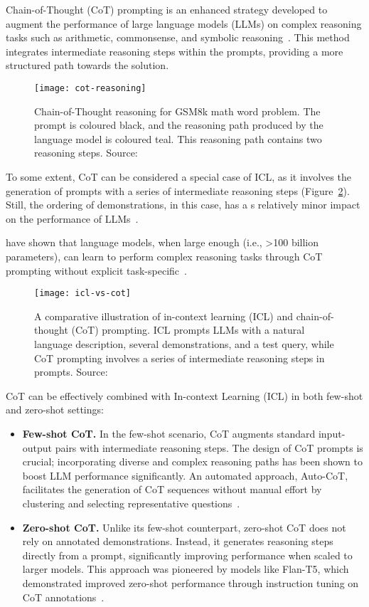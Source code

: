 Chain-of-Thought (CoT) prompting is an enhanced strategy developed to augment the performance of large language models (LLMs) on complex reasoning tasks such as arithmetic, commonsense, and symbolic reasoning~\cite{wei2022chain, miao2021diverse, talmor2019commonsenseqa}.
This method integrates intermediate reasoning steps within the prompts, providing a more structured path towards the solution.
\begin{figure}[h!]
	\centering
	\texttt{[image: cot-reasoning]}
	\caption{Chain-of-Thought reasoning for GSM8k math word problem. The prompt is coloured black, and the reasoning path produced by the language model is coloured teal. This reasoning path contains two reasoning steps. Source: \textcite{li2022making}}
	\label{fig:cot-reasoning}
\end{figure}
To some extent, CoT can be considered a special case of ICL, as it involves the generation of prompts with a series of intermediate reasoning steps (Figure~\ref{fig:chain-of-thought}). Still, the ordering of demonstrations, in this case, has a s relatively minor impact on the performance of LLMs~\cite{wei2022chain}.

\textcite{wei2022chain, wang2022self} have shown that language models, when large enough (i.e., \textgreater 100 billion parameters), can learn to perform complex reasoning tasks through CoT prompting without explicit task-specific~\cite{wei2022emergent}.

\begin{figure}[h!]
	\centering
	\texttt{[image: icl-vs-cot]}
	\caption{A comparative illustration of in-context learning (ICL) and chain-of-thought (CoT) prompting. ICL prompts LLMs with a natural language description, several demonstrations, and a test query, while CoT prompting involves a series of intermediate reasoning steps in prompts. Source: \textcite{survey}}
	\label{fig:chain-of-thought}
\end{figure}

CoT can be effectively combined with In-context Learning (ICL) in both few-shot and zero-shot settings:
\begin{itemize}
	\item \textbf{Few-shot CoT.} {In the few-shot scenario, CoT augments standard input-output pairs with intermediate reasoning steps.
		      The design of CoT prompts is crucial; incorporating diverse and complex reasoning paths has been shown to boost LLM performance significantly.
		      An automated approach, Auto-CoT, facilitates the generation of CoT sequences without manual effort by clustering and selecting representative questions~\cite{zhang2022automatic}.
	      }
	\item \textbf{Zero-shot CoT.} {Unlike its few-shot counterpart, zero-shot CoT does not rely on annotated demonstrations.
		      Instead, it generates reasoning steps directly from a prompt, significantly improving performance when scaled to larger models.
		      This approach was pioneered by models like Flan-T5, which demonstrated improved zero-shot performance through instruction tuning on CoT annotations~\cite{chung2022scaling}.
	      }
\end{itemize}

